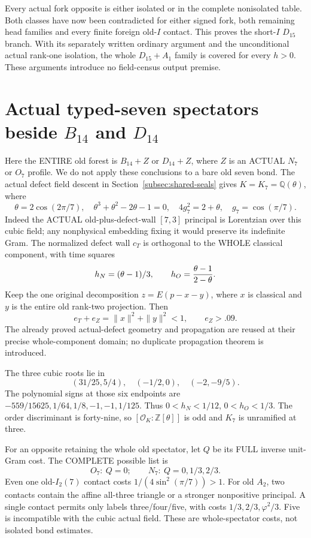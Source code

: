 \documentclass[11pt]{article}
\begin{document}
Every actual fork opposite is either isolated or
in the complete nonisolated table.
Both classes have now been contradicted for either
signed fork, both remaining head families and
every finite foreign old-\(I\) contact.
This proves the short-\(I\) \(D_{15}\) branch.
With its separately written ordinary argument and
the unconditional actual rank-one isolation, the
whole \(D_{15}+A_1\) family is covered for every \(h>0\).
These arguments introduce no field-census output premise.

\section{Actual typed-seven spectators beside \(B_{14}\) and \(D_{14}\)}
\label{app:arithBD14typed}

Here the ENTIRE old forest is \(B_{14}+Z\) or
\(D_{14}+Z\), where \(Z\) is an ACTUAL \(N_7\)
or \(O_7\) profile.
We do not apply these conclusions to a bare old
seven bond.
The actual defect field descent in
Section~\ref{subsec:shared-seals} gives
\(K=K_7=\mathbb Q(\theta)\), where
\[
 \theta=2\cos(2\pi/7),\quad
 \theta^3+\theta^2-2\theta-1=0,\quad
 4g_7^2=2+\theta,\quad g_7=\cos(\pi/7).
\]
Indeed the ACTUAL old-plus-defect-wall \([7,3]\)
principal is Lorentzian over this cubic field;
any nonphysical embedding fixing it would preserve
its indefinite Gram.
The normalized defect wall \(c_T\) is orthogonal
to the WHOLE classical component, with time squares
\[
                     h_N=(\theta-1)/3,\qquad
                     h_O={\theta-1\over2-\theta}.
\]
Keep the one original decomposition \(z=E(p-x-y)\),
where \(x\) is classical and \(y\) is the entire
old rank-two projection.
Then
\[
                   e_T+e_Z=\|x\|^2+\|y\|^2<1,\qquad e_Z>.09 .
\]
The already proved actual-defect geometry and
propagation are reused at their precise whole-component
domain; no duplicate propagation theorem is introduced.

The three cubic roots lie in
\[
              (31/25,5/4),\quad(-1/2,0),\quad(-2,-9/5).
\]
The polynomial signs at those six endpoints are
\(-559/15625,1/64,1/8,-1,-1,1/125\).
Thus \(0<h_N<1/12\), \(0<h_O<1/3\).
The order discriminant is forty-nine, so
\([\mathcal O_K:\mathbb Z[\theta]]\) is odd and
\(K_7\) is unramified at three.

For an opposite retaining the whole old spectator,
let \(Q\) be its FULL inverse unit-Gram cost.
The COMPLETE possible list is
\[
                       O_7:\ Q=0;\qquad
                       N_7:\ Q=0,1/3,2/3 .
\tag{TQ}\label{eq:arithBD14foreign}
\]
Even one old-\(I_2(7)\) contact costs
\(1/(4\sin^2(\pi/7))>1\).
For old \(A_2\), two contacts contain the affine
all-three triangle or a stronger nonpositive principal.
A single contact permits only labels three/four/five,
with costs \(1/3,2/3,\varphi^2/3\).
Five is incompatible with the cubic actual field.
These are whole-spectator costs, not isolated
bond estimates.
\end{document}
